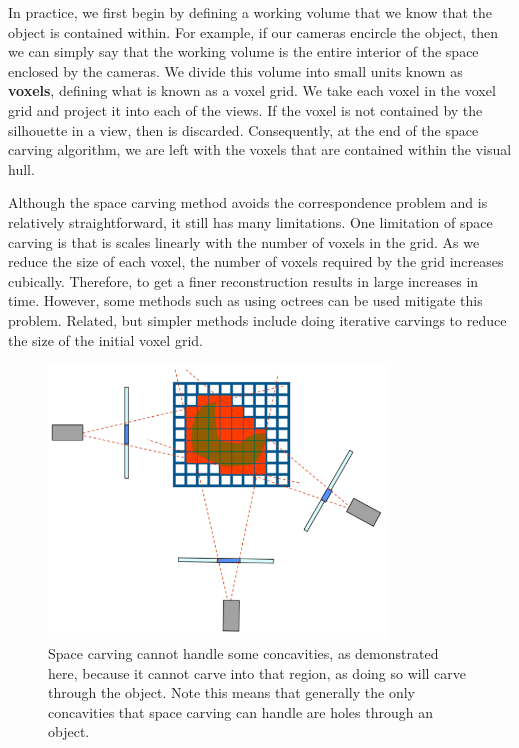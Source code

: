 \documentclass[a4paper, 12pt]{article}
\renewcommand\emph{\textbf}
\numberwithin{equation}{section}
\begin{document}
In practice, we first begin by defining a working volume  that we know that the object is contained within. For example, if our cameras encircle the object, then we can simply say that the working volume is the entire interior of the space enclosed by the cameras. We divide this volume into small units known as \emph{voxels}, defining what is known as a voxel grid. We take each voxel in the voxel grid and project it into each of the views. If the voxel is not contained by the silhouette in a view, then is discarded. Consequently, at the end of the space carving algorithm, we are left with the voxels that are contained within the visual hull.

Although the space carving method avoids the correspondence problem and is relatively straightforward, it still has many limitations. One limitation of space carving is that is scales linearly with the number of voxels in the grid. As we reduce the size of each voxel, the number of voxels required by the grid increases cubically. Therefore, to get a finer reconstruction results in large increases in time. However, some methods such as using octrees can be used mitigate this problem. Related, but simpler methods include doing iterative carvings to reduce the size of the initial voxel grid. 

\begin{figure}[h!]
    \centering
    \includegraphics[width = 0.8\textwidth]{figures/concavity.png}
    \caption{Space carving cannot handle some concavities, as demonstrated here, because it cannot carve into that region, as doing so will carve through the object. Note this means that generally the only concavities that space carving can handle are holes through an object. }
    \label{fig:concavity}
\end{figure}
\end{document}
